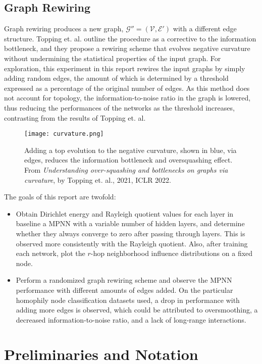 \documentclass[11pt]{article}
\begin{document}
\subsection{Graph Rewiring}

Graph rewiring produces a new graph, $\mathcal{G}'' = (\mathcal{V}, \mathcal{E}')$ with a different edge structure. Topping et. al. outline the procedure as a corrective to the information bottleneck, and they propose a rewiring scheme that evolves negative curvature without undermining the statistical properties of the input graph. For exploration, this experiment in this report rewires the input graphs by simply adding random edges, the amount of which is determined by a threshold expressed as a percentage of the original number of edges. As this method does not account for topology, the information-to-noise ratio in the graph is lowered, thus reducing the performances of the networks as the threshold increases, contrasting from the results of Topping et. al.

\begin{figure}
    \centering
    \texttt{[image: curvature.png]}
    \caption{Adding a top evolution to the negative curvature, shown in blue, via edges, reduces the information bottleneck and oversquashing effect. From \textit{Understanding over-squashing and bottlenecks on graphs via curvature}, by Topping et. al., 2021, ICLR 2022.}
    \label{fig:curvature}
\end{figure}

The goals of this report are twofold:
\begin{itemize}
    \item Obtain Dirichlet energy and Rayleigh quotient values for each layer in baseline a MPNN with a variable number of hidden layers, and determine whether they always converge to zero after passing through layers. This is observed more consistently with the Rayleigh quotient. Also, after training each network, plot the $r$-hop neighborhood influence distributions on a fixed node.   
    \item Perform a randomized graph rewiring scheme and observe the MPNN performance with different amounts of edges added. On the particular homophily node classification datasets used, a drop in performance with adding more edges is observed, which could be attributed to oversmoothing, a decreased information-to-noise ratio, and a lack of long-range interactions.
\end{itemize}

\section{Preliminaries and Notation}
\end{document}
